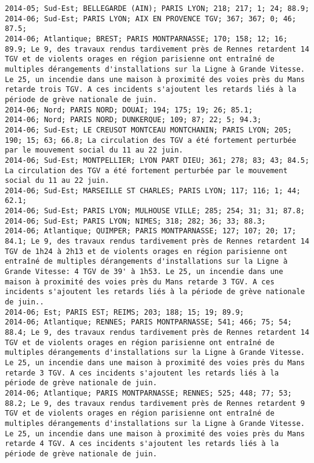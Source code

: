 \documentclass{article}
\begin{document}
\begin{Verbatim}[commandchars=\\\{\}]
2014-05; Sud-Est; BELLEGARDE (AIN); PARIS LYON; 218; 217; 1; 24; 88.9; 
2014-06; Sud-Est; PARIS LYON; AIX EN PROVENCE TGV; 367; 367; 0; 46; 87.5; 
2014-06; Atlantique; BREST; PARIS MONTPARNASSE; 170; 158; 12; 16; 89.9; Le 9, des travaux rendus tardivement près de Rennes retardent 14 TGV et de violents orages en région parisienne ont entraîné de multiples dérangements d'installations sur la Ligne à Grande Vitesse. Le 25, un incendie dans une maison à proximité des voies près du Mans retarde trois TGV. A ces incidents s'ajoutent les retards liés à la période de grève nationale de juin.
2014-06; Nord; PARIS NORD; DOUAI; 194; 175; 19; 26; 85.1; 
2014-06; Nord; PARIS NORD; DUNKERQUE; 109; 87; 22; 5; 94.3; 
2014-06; Sud-Est; LE CREUSOT MONTCEAU MONTCHANIN; PARIS LYON; 205; 190; 15; 63; 66.8; La circulation des TGV a été fortement perturbée par le mouvement social du 11 au 22 juin.
2014-06; Sud-Est; MONTPELLIER; LYON PART DIEU; 361; 278; 83; 43; 84.5; La circulation des TGV a été fortement perturbée par le mouvement social du 11 au 22 juin.
2014-06; Sud-Est; MARSEILLE ST CHARLES; PARIS LYON; 117; 116; 1; 44; 62.1; 
2014-06; Sud-Est; PARIS LYON; MULHOUSE VILLE; 285; 254; 31; 31; 87.8; 
2014-06; Sud-Est; PARIS LYON; NIMES; 318; 282; 36; 33; 88.3; 
2014-06; Atlantique; QUIMPER; PARIS MONTPARNASSE; 127; 107; 20; 17; 84.1; Le 9, des travaux rendus tardivement près de Rennes retardent 14 TGV de 1h24 à 2h13 et de violents orages en région parisienne ont entraîné de multiples dérangements d'installations sur la Ligne à Grande Vitesse: 4 TGV de 39' à 1h53. Le 25, un incendie dans une maison à proximité des voies près du Mans retarde 3 TGV. A ces incidents s'ajoutent les retards liés à la période de grève nationale de juin..
2014-06; Est; PARIS EST; REIMS; 203; 188; 15; 19; 89.9; 
2014-06; Atlantique; RENNES; PARIS MONTPARNASSE; 541; 466; 75; 54; 88.4; Le 9, des travaux rendus tardivement près de Rennes retardent 14 TGV et de violents orages en région parisienne ont entraîné de multiples dérangements d'installations sur la Ligne à Grande Vitesse. Le 25, un incendie dans une maison à proximité des voies près du Mans retarde 3 TGV. A ces incidents s'ajoutent les retards liés à la période de grève nationale de juin.
2014-06; Atlantique; PARIS MONTPARNASSE; RENNES; 525; 448; 77; 53; 88.2; Le 9, des travaux rendus tardivement près de Rennes retardent 9 TGV et de violents orages en région parisienne ont entraîné de multiples dérangements d'installations sur la Ligne à Grande Vitesse. Le 25, un incendie dans une maison à proximité des voies près du Mans retarde 4 TGV. A ces incidents s'ajoutent les retards liés à la période de grève nationale de juin.

\end{Verbatim}
\end{document}
